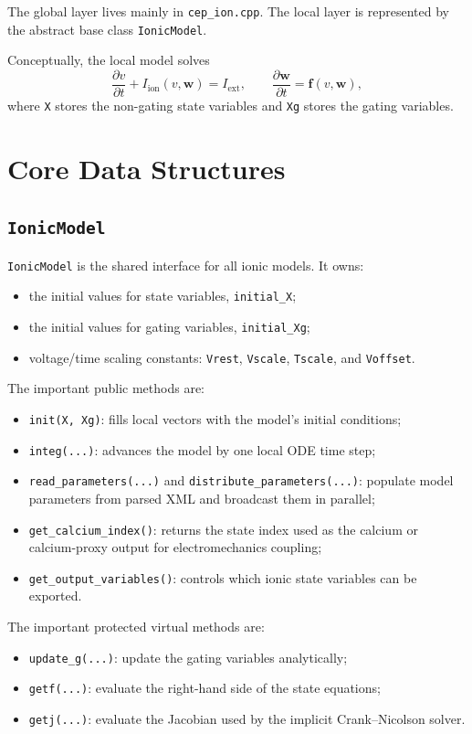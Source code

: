 \documentclass[11pt]{article}
\begin{document}
The global layer lives mainly in \texttt{cep\_ion.cpp}. The local layer is represented by the abstract base class \texttt{IonicModel}.

Conceptually, the local model solves
\[
\frac{\partial v}{\partial t} + I_{\mathrm{ion}}(v,\mathbf{w}) = I_{\mathrm{ext}},
\qquad
\frac{\partial \mathbf{w}}{\partial t} = \mathbf{f}(v,\mathbf{w}),
\]
where \texttt{X} stores the non-gating state variables and \texttt{Xg} stores the gating variables.

\section{Core Data Structures}

\subsection{\texttt{IonicModel}}

\texttt{IonicModel} is the shared interface for all ionic models. It owns:
\begin{itemize}[leftmargin=*]
\item the initial values for state variables, \texttt{initial\_X};
\item the initial values for gating variables, \texttt{initial\_Xg};
\item voltage/time scaling constants:
  \texttt{Vrest}, \texttt{Vscale}, \texttt{Tscale}, and \texttt{Voffset}.
\end{itemize}

The important public methods are:
\begin{itemize}[leftmargin=*]
\item \texttt{init(X, Xg)}: fills local vectors with the model's initial conditions;
\item \texttt{integ(...)}: advances the model by one local ODE time step;
\item \texttt{read\_parameters(...)} and \texttt{distribute\_parameters(...)}: populate model parameters from parsed XML and broadcast them in parallel;
\item \texttt{get\_calcium\_index()}: returns the state index used as the calcium or calcium-proxy output for electromechanics coupling;
\item \texttt{get\_output\_variables()}: controls which ionic state variables can be exported.
\end{itemize}

The important protected virtual methods are:
\begin{itemize}[leftmargin=*]
\item \texttt{update\_g(...)}: update the gating variables analytically;
\item \texttt{getf(...)}: evaluate the right-hand side of the state equations;
\item \texttt{getj(...)}: evaluate the Jacobian used by the implicit Crank--Nicolson solver.
\end{itemize}
\end{document}
